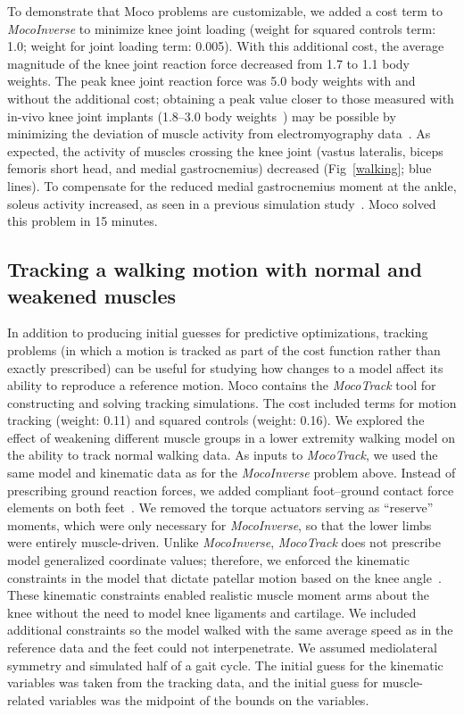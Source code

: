 \documentclass[10pt,letterpaper]{article}
\begin{document}
To demonstrate that Moco problems are customizable, we added a cost term to \textit{MocoInverse} to minimize knee joint loading (weight for squared controls term: 1.0; weight for joint loading term: 0.005). With this additional cost, the average magnitude of the knee joint reaction force decreased from 1.7 to 1.1 body weights. The peak knee joint reaction force was 5.0 body weights with and without the additional cost; obtaining a peak value closer to those measured with in-vivo knee joint implants (1.8--3.0 body weights~\cite{Fregly:2011ke}) may be possible by minimizing the deviation of muscle activity from electromyography data~\cite{Kinney:2013}. As expected, the activity of muscles crossing the knee joint (vastus lateralis, biceps femoris short head, and medial gastrocnemius) decreased (Fig~\ref{walking}; blue lines). To compensate for the reduced medial gastrocnemius moment at the ankle, soleus activity increased, as seen in a previous simulation study~\cite{DeMers:2014}. Moco solved this problem in 15 minutes.

\subsection*{Tracking a walking motion with normal and weakened muscles}

In addition to producing initial guesses for predictive optimizations, tracking problems (in which a motion is tracked as part of the cost function rather than exactly prescribed) can be useful for studying how changes to a model affect its ability to reproduce a reference motion. Moco contains the \textit{MocoTrack} tool for constructing and solving tracking simulations. The cost included terms for motion tracking (weight: 0.11) and squared controls (weight: 0.16). We explored the effect of weakening different muscle groups in a lower extremity walking model on the ability to track normal walking data. As inputs to \textit{MocoTrack}, we used the same model and kinematic data as for the \textit{MocoInverse} problem above. Instead of prescribing ground reaction forces, we added compliant foot--ground contact force elements on both feet~\cite{Falisse:2019b}. We removed the torque actuators serving as ``reserve'' moments, which were only necessary for \textit{MocoInverse}, so that the lower limbs were entirely muscle-driven. Unlike \textit{MocoInverse}, \textit{MocoTrack} does not prescribe model generalized coordinate values; therefore, we enforced the kinematic constraints in the model that dictate patellar motion based on the knee angle~\cite{Arnold:2010}. These kinematic constraints enabled realistic muscle moment arms about the knee without the need to model knee ligaments and cartilage. We included additional constraints so the model walked with the same average speed as in the reference data and the feet could not interpenetrate. We assumed mediolateral symmetry and simulated half of a gait cycle. The initial guess for the kinematic variables was taken from the tracking data, and the initial guess for muscle-related variables was the midpoint of the bounds on the variables.
\end{document}
